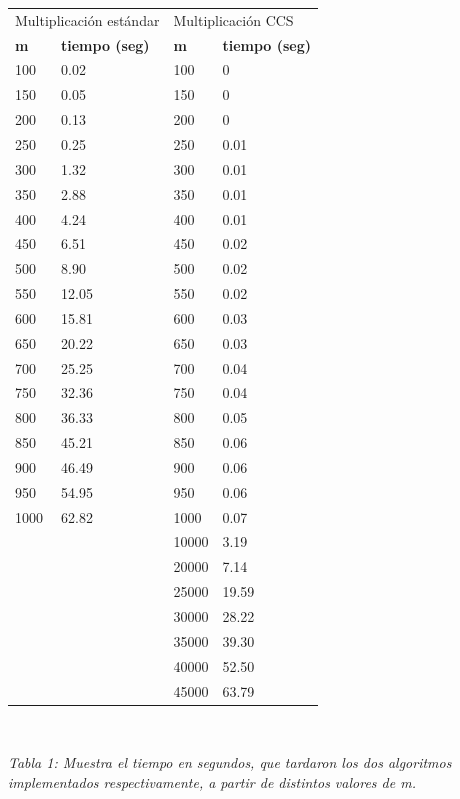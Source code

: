 \documentclass[a4paper,11pt]{article}
\begin{document}
{\centering
\begin{tabular}{|l||l|l||l|}
\hline
\multicolumn{2}{|l|}{Multiplicaci\'on est\'andar}&\multicolumn{2}{l|}{Multiplicaci\'on CCS}\\
\cline{1-4}
\textbf{m}&\textbf{tiempo (seg)}&\textbf{m}&\textbf{tiempo (seg)}\\
\hline\hline
100 & 0.02 & 100 & 0\\
150 & 0.05 & 150 & 0\\
200 & 0.13 & 200 & 0\\
250 & 0.25 & 250 & 0.01\\
300 & 1.32 & 300 & 0.01\\
350 & 2.88 & 350 & 0.01\\
400 & 4.24 & 400 & 0.01\\
450 & 6.51 & 450 & 0.02\\
500 & 8.90 & 500 & 0.02\\
550 & 12.05 & 550 & 0.02\\
600 & 15.81 & 600 & 0.03\\
650 & 20.22 & 650 & 0.03\\
700 & 25.25 & 700 & 0.04\\
750 & 32.36 & 750 & 0.04\\
800 & 36.33 & 800 & 0.05\\
850 & 45.21 & 850 & 0.06\\
900 & 46.49 & 900 & 0.06\\
950 & 54.95 & 950 & 0.06\\
1000 & 62.82 & 1000 & 0.07\\
 &  & 10000 & 3.19\\
 &  & 20000 & 7.14\\
 &  & 25000 & 19.59\\
 &  & 30000 & 28.22\\
 &  & 35000 & 39.30\\
 &  & 40000 & 52.50\\
 &  & 45000 & 63.79\\
\hline
\end{tabular}\\[6pt]
}
\small\emph{Tabla 1: Muestra el tiempo en segundos, que tardaron los dos algoritmos implementados respectivamente, a partir de distintos valores de m.}
\end{document}
